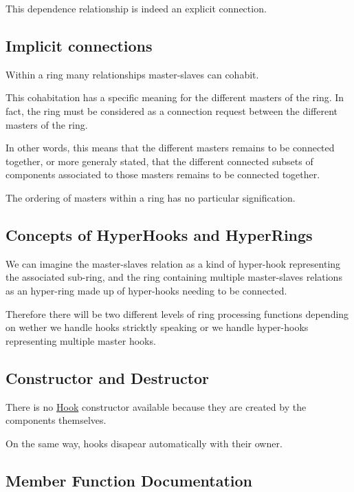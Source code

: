 This dependence relationship is indeed an explicit connection.\hypertarget{classHurricane_1_1Hook_secHookImplicitConnections}{}\subsection{Implicit connections}\label{classHurricane_1_1Hook_secHookImplicitConnections}
Within a ring many relationships master-\/slaves can cohabit.

This cohabitation has a specific meaning for the different masters of the ring. In fact, the ring must be considered as a connection request between the different masters of the ring.

In other words, this means that the different masters remains to be connected together, or more generaly stated, that the different connected subsets of components associated to those masters remains to be connected together.

The ordering of masters within a ring has no particular signification.\hypertarget{classHurricane_1_1Hook_secHookConceptsOfHyperhooksAndHyperrings}{}\subsection{Concepts of Hyper\+Hooks and Hyper\+Rings}\label{classHurricane_1_1Hook_secHookConceptsOfHyperhooksAndHyperrings}
We can imagine the master-\/slaves relation as a kind of hyper-\/hook representing the associated sub-\/ring, and the ring containing multiple master-\/slaves relations as an hyper-\/ring made up of hyper-\/hooks needing to be connected.

Therefore there will be two different levels of ring processing functions depending on wether we handle hooks stricktly speaking or we handle hyper-\/hooks representing multiple master hooks.\hypertarget{classHurricane_1_1Hook_secHookConstructorAndDestructor}{}\subsection{Constructor and Destructor}\label{classHurricane_1_1Hook_secHookConstructorAndDestructor}
There is no \mbox{\hyperlink{classHurricane_1_1Hook}{Hook}} constructor available because they are created by the components themselves.

On the same way, hooks disapear automatically with their owner. 

\subsection{Member Function Documentation}
\mbox{\label{classHurricane_1_1Hook_ab420305aa59b8ff10d59678363de2511}} 
